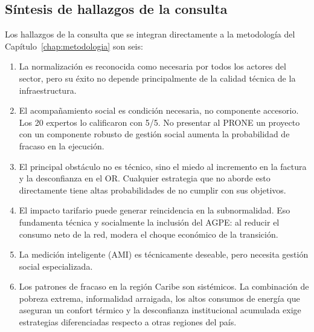 \subsection{Síntesis de hallazgos de la consulta}
\label{subsec:sintesis_consulta}

Los hallazgos de la consulta que se integran directamente a la metodología del Capítulo~\ref{chap:metodologia} son seis:

\begin{enumerate}[label=\textbf{\arabic*.}, leftmargin=1.5cm, itemsep=8pt]

    \item La normalización es reconocida como necesaria por todos los actores del sector, pero su éxito no depende principalmente de la calidad técnica de la infraestructura.

    \item El acompañamiento social es condición necesaria, no componente accesorio. Los 20 expertos lo calificaron con 5/5. No presentar al PRONE un proyecto con un componente robusto de gestión social aumenta la probabilidad de fracaso en la ejecución.

    \item El principal obstáculo no es técnico, sino el miedo al incremento en la factura y la desconfianza en el OR. Cualquier estrategia que no aborde esto directamente tiene altas probabilidades de no cumplir con sus objetivos.

    \item El impacto tarifario puede generar reincidencia en la subnormalidad. Eso fundamenta técnica y socialmente la inclusión del AGPE: al reducir el consumo neto de la red, modera el choque económico de la transición.

    \item La medición inteligente (AMI) es técnicamente deseable, pero necesita gestión social especializada.

    \item Los patrones de fracaso en la región Caribe son sistémicos. La combinación de pobreza extrema, informalidad arraigada, los altos consumos de energía que aseguran un confort térmico y la desconfianza institucional acumulada exige estrategias diferenciadas respecto a otras regiones del país.

\end{enumerate}